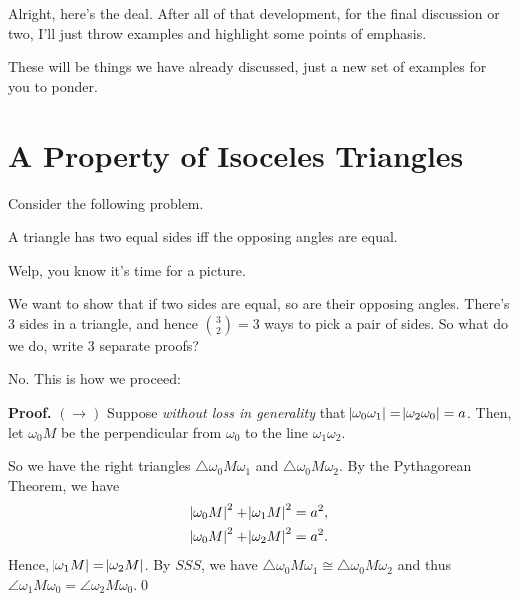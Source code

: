 

Alright, here's the deal. After all of that development, for the final discussion or two, I'll just throw examples and highlight some points of emphasis.

These will be things we have already discussed, just a new set of examples for you to ponder.
\section*{A Property of Isoceles Triangles}
Consider the following problem.
\begin{SNP}{\prb}A triangle has two equal sides iff the opposing angles are equal.
\end{SNP}
Welp, you know it's time for a picture.
\begin{center}
\end{center}
We want to show that if two sides are equal, so are their opposing angles. There's $3$ sides in a triangle, and hence $\binom 3 2 = 3$ ways to pick a pair of sides. So what do we do, write $3$ separate proofs?

No. This is how we proceed:
\begin{smrg}
\textbf{Proof.} $(\rightarrow)$ Suppose \textit{without loss in generality} that $\abs{\omega_0\omega_1} = \abs{\omega_2\omega_0} = a$. Then, let $\omega_0 M$ be the perpendicular from $\omega_0$ to the line $\omega_1\omega_2$.

So we have the right triangles $\triangle \omega_0 M \omega_1$ and $\triangle \omega_0 M \omega_2$. By the Pythagorean Theorem, we have
\begin{align*}
    \abs{\omega_0 M}^2 + \abs{\omega_1 M}^2 &= a^2, \\
    \abs{\omega_0 M}^2 + \abs{\omega_2 M}^2 &= a^2.
\end{align*}
Hence, $\abs{\omega_1 M} = \abs{\omega_2 M}$. By $SSS$, we have $\triangle \omega_0 M \omega_1 \cong \triangle \omega_0 M \omega_2$ and thus $\angle \omega_1 M \omega_0 = \angle \omega_2 M \omega_0$.\qed
\end{smrg}

